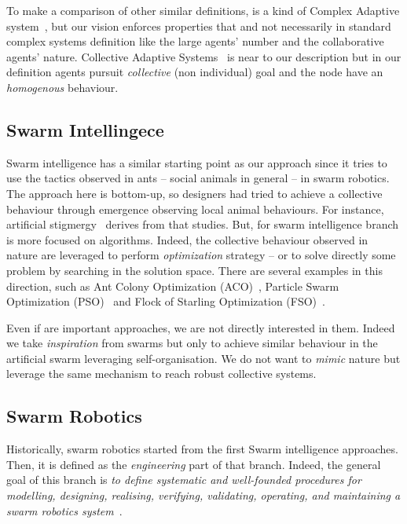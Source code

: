 \documentclass[11pt]{article}
\begin{document}
To make a comparison of other similar definitions, \cpsw{} is a kind of Complex Adaptive system~\cite{holland1992complex}, but our vision enforces properties that and not necessarily in standard complex systems definition like the large agents' number and the collaborative agents' nature.
Collective Adaptive Systems~\cite{DBLP:journals/corr/abs-1108-5643} is near to our \cpsw{} description but in our definition agents pursuit \emph{collective} (non individual) goal and the node have an \emph{homogenous} behaviour.
\subsection{Swarm Intellingece}
Swarm intelligence has a similar starting point as our approach since it tries to use the tactics observed in ants -- social animals in general -- in swarm robotics. The approach here is bottom-up, so designers had tried to achieve a collective behaviour through emergence observing local animal behaviours.
%
For instance, artificial stigmergy~\cite{DBLP:journals/fgcs/DorigoBT00} derives from that studies. But, for swarm intelligence branch is more focused on algorithms. 
Indeed, the collective behaviour observed in nature are leveraged to perform \textit{optimization} strategy -- or to solve directly some problem by searching in the solution space.
There are several examples in this direction, such as Ant Colony Optimization (ACO)~\cite{DBLP:journals/tsmc/DorigoMC96}, Particle Swarm Optimization (PSO)~\cite{DBLP:conf/icnn/KennedyE95} and Flock of Starling Optimization (FSO)~\cite{DBLP:series/sci/FulgineiS11}.

Even if are important approaches, we are not directly interested in them. Indeed we take \textit{inspiration} from swarms but only to achieve similar behaviour in the artificial swarm leveraging self-organisation. We do not want to \textit{mimic} nature but leverage the same mechanism to reach robust collective systems.
\subsection{Swarm Robotics}
Historically, swarm robotics started from the first Swarm intelligence approaches. Then, it is defined as the \textit{engineering} part of that branch. Indeed, the general goal of this branch is \emph{to define systematic and well-founded procedures for modelling, designing, realising, verifying, validating, operating, and maintaining a swarm robotics system}~\cite{DBLP:journals/swarm/BrambillaFBD13}.
\end{document}
